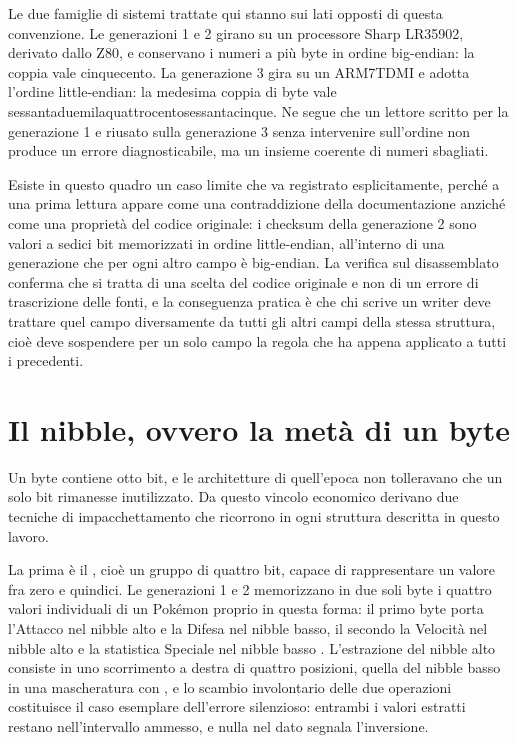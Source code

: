Le due famiglie di sistemi trattate qui stanno sui lati opposti di questa convenzione. Le generazioni 1 e 2 girano su un processore Sharp LR35902, derivato dallo Z80, e conservano i numeri a più byte in ordine big-endian: la coppia   vale cinquecento. La generazione 3 gira su un ARM7TDMI e adotta l'ordine little-endian: la medesima coppia di byte vale sessantaduemilaquattrocentosessantacinque. Ne segue che un lettore scritto per la generazione 1 e riusato sulla generazione 3 senza intervenire sull'ordine non produce un errore diagnosticabile, ma un insieme coerente di numeri sbagliati.

Esiste in questo quadro un caso limite che va registrato esplicitamente, perché a una prima lettura appare come una contraddizione della documentazione anziché come una proprietà del codice originale: i checksum della generazione 2 sono valori a sedici bit memorizzati in ordine little-endian, all'interno di una generazione che per ogni altro campo è big-endian. La verifica sul disassemblato \cite{pokecrystal} conferma che si tratta di una scelta del codice originale e non di un errore di trascrizione delle fonti, e la conseguenza pratica è che chi scrive un writer deve trattare quel campo diversamente da tutti gli altri campi della stessa struttura, cioè deve sospendere per un solo campo la regola che ha appena applicato a tutti i precedenti.

\section{Il nibble, ovvero la metà di un byte}

Un byte contiene otto bit, e le architetture di quell'epoca non tolleravano che un solo bit rimanesse inutilizzato. Da questo vincolo economico derivano due tecniche di impacchettamento che ricorrono in ogni struttura descritta in questo lavoro.

La prima è il , cioè un gruppo di quattro bit, capace di rappresentare un valore fra zero e quindici. Le generazioni 1 e 2 memorizzano in due soli byte i quattro valori individuali di un Pokémon proprio in questa forma: il primo byte porta l'Attacco nel nibble alto e la Difesa nel nibble basso, il secondo la Velocità nel nibble alto e la statistica Speciale nel nibble basso \cite{pokered}. L'estrazione del nibble alto consiste in uno scorrimento a destra di quattro posizioni, quella del nibble basso in una mascheratura con , e lo scambio involontario delle due operazioni costituisce il caso esemplare dell'errore silenzioso: entrambi i valori estratti restano nell'intervallo ammesso, e nulla nel dato segnala l'inversione.

